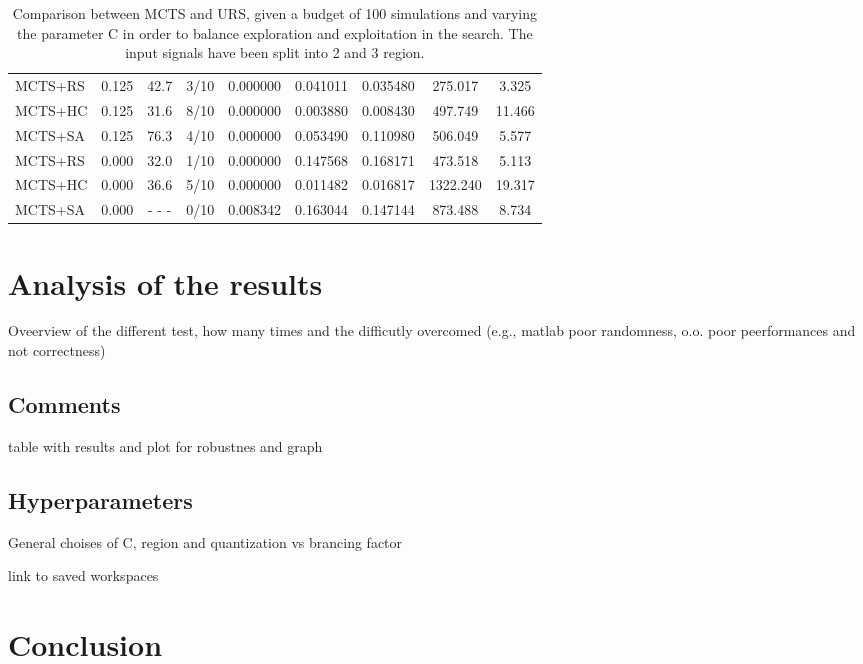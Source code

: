 \documentclass[11pt]{article}
\begin{document}
\begin{table}[ht]
\begin{tabular}{|l|l|c|c|c|c|c|c|c|}
MCTS+RS                                     & 0.125              &  42.7                   & 3/10                          & 0.000000 & 0.041011 & 0.035480  &  275.017   &  3.325       \\
MCTS+HC                                     & 0.125              &  31.6                   & 8/10                          & 0.000000 & 0.003880 & 0.008430  &  497.749   & 11.466       \\
MCTS+SA                                     & 0.125              &  76.3                   & 4/10                          & 0.000000 & 0.053490 & 0.110980  &  506.049   &  5.577       \\ \hline
MCTS+RS                                     & 0.000              &  32.0                   & 1/10                          & 0.000000 & 0.147568 & 0.168171  &  473.518   &  5.113       \\
MCTS+HC                                     & 0.000              &  36.6                   & 5/10                          & 0.000000 & 0.011482 & 0.016817  & 1322.240   & 19.317       \\
MCTS+SA                                     & 0.000              & - - -                   & 0/10                          & 0.008342 & 0.163044 & 0.147144  &  873.488   &  8.734       \\ \hline
\end{tabular}
\caption{Comparison between MCTS and URS, given a budget of 100 simulations and varying the parameter C in order to balance exploration and exploitation in the search. The input signals have been split into 2 and 3 region.}
\end{table}
\pagebreak

\section{Analysis of the results}
Oveerview of the different test, how many times and the difficutly overcomed (e.g., matlab poor randomness, o.o. poor peerformances and not correctness)

\subsection{Comments}
table with results and plot for robustnes and graph

\subsection{Hyperparameters}
General choises of C, region and quantization vs brancing factor

link to saved workspaces

\section{Conclusion}



\end{document}
